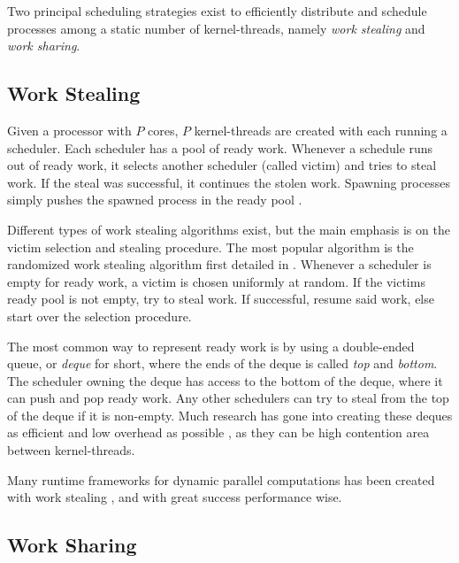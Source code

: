 Two principal scheduling strategies exist to efficiently distribute and schedule processes among a static number of kernel\hyp{}threads, namely \textit{work stealing} and \textit{work sharing}.


\subsection{Work Stealing}
\label{subsec:work_stealing}


Given a processor with $P$ cores, $P$ kernel\hyp{}threads are created with each running a scheduler. Each scheduler has a pool of ready work. Whenever a schedule runs out of ready work, it selects another scheduler (called victim) and tries to steal work. If the steal was successful, it continues the stolen work. Spawning processes simply pushes the spawned process in the ready pool \citep{blumofe1999scheduling}.

Different types of work stealing algorithms exist, but the main emphasis is on the victim selection and stealing procedure. The most popular algorithm is the randomized work stealing algorithm first detailed in \citet{blumofe1999scheduling}. Whenever a scheduler is empty for ready work, a victim is chosen uniformly at random. If the victims ready pool is not empty, try to steal work. If successful, resume said work, else start over the selection procedure.

The most common way to represent ready work is by using a double\hyp{}ended queue, or \textit{deque} for short, where the ends of the deque is called \textit{top} and \textit{bottom}. The scheduler owning the deque has access to the bottom of the deque, where it can push and pop ready work. Any other schedulers can try to steal from the top of the deque if it is non\hyp{}empty. Much research has gone into creating these deques as efficient and low overhead as possible \citep{chase2005dynamic,le2013correct}, as they can be high contention area between kernel\hyp{}threads.

Many runtime frameworks for dynamic parallel computations has been created with work stealing \citep{blumofe1996cilk,sunderam1990pvm}, and with great success performance wise.


\subsection{Work Sharing}
\label{subsec:work_sharing}


